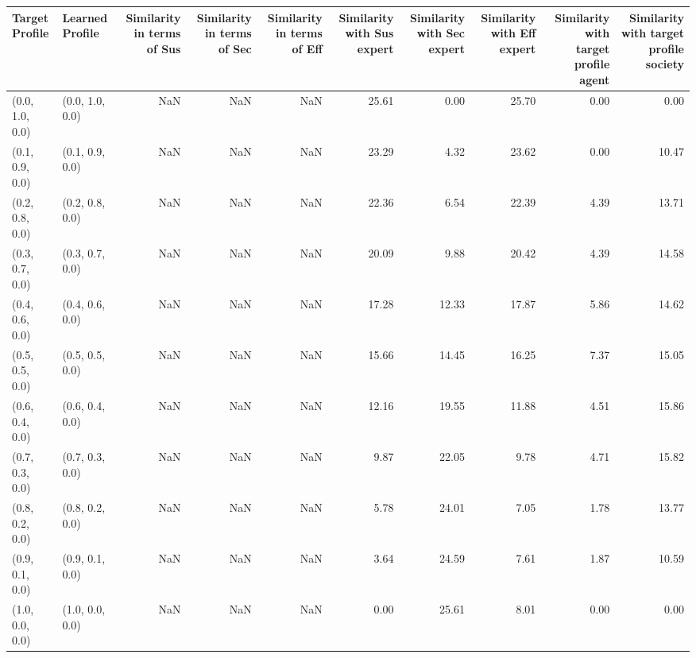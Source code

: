 \begin{tabular}{llrrrrrrrr}
\toprule
Target Profile & Learned Profile & Similarity in terms of Sus & Similarity in terms of Sec & Similarity in terms of Eff & Similarity with Sus expert & Similarity with Sec expert & Similarity with Eff expert & Similarity with target profile agent & Similarity with target profile society \\
\midrule
(0.0, 1.0, 0.0) & (0.0, 1.0, 0.0) & NaN & NaN & NaN & 25.61 & 0.00 & 25.70 & 0.00 & 0.00 \\
(0.1, 0.9, 0.0) & (0.1, 0.9, 0.0) & NaN & NaN & NaN & 23.29 & 4.32 & 23.62 & 0.00 & 10.47 \\
(0.2, 0.8, 0.0) & (0.2, 0.8, 0.0) & NaN & NaN & NaN & 22.36 & 6.54 & 22.39 & 4.39 & 13.71 \\
(0.3, 0.7, 0.0) & (0.3, 0.7, 0.0) & NaN & NaN & NaN & 20.09 & 9.88 & 20.42 & 4.39 & 14.58 \\
(0.4, 0.6, 0.0) & (0.4, 0.6, 0.0) & NaN & NaN & NaN & 17.28 & 12.33 & 17.87 & 5.86 & 14.62 \\
(0.5, 0.5, 0.0) & (0.5, 0.5, 0.0) & NaN & NaN & NaN & 15.66 & 14.45 & 16.25 & 7.37 & 15.05 \\
(0.6, 0.4, 0.0) & (0.6, 0.4, 0.0) & NaN & NaN & NaN & 12.16 & 19.55 & 11.88 & 4.51 & 15.86 \\
(0.7, 0.3, 0.0) & (0.7, 0.3, 0.0) & NaN & NaN & NaN & 9.87 & 22.05 & 9.78 & 4.71 & 15.82 \\
(0.8, 0.2, 0.0) & (0.8, 0.2, 0.0) & NaN & NaN & NaN & 5.78 & 24.01 & 7.05 & 1.78 & 13.77 \\
(0.9, 0.1, 0.0) & (0.9, 0.1, 0.0) & NaN & NaN & NaN & 3.64 & 24.59 & 7.61 & 1.87 & 10.59 \\
(1.0, 0.0, 0.0) & (1.0, 0.0, 0.0) & NaN & NaN & NaN & 0.00 & 25.61 & 8.01 & 0.00 & 0.00 \\
\bottomrule
\end{tabular}
